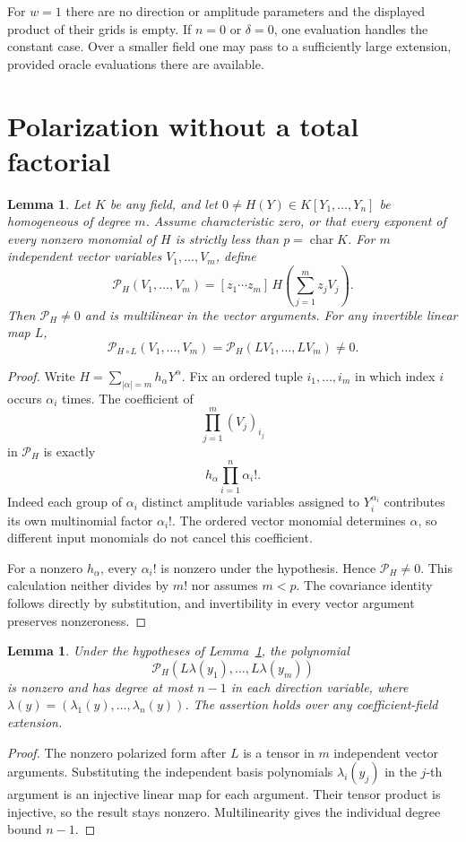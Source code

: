 \documentclass[11pt]{article}
\newtheorem{lemma}[theorem]{Lemma}
\begin{document}
For \(w=1\) there are no direction or amplitude parameters and
the displayed product of their grids is empty.
If \(n=0\) or \(\delta=0\), one evaluation handles the constant case.
Over a smaller field one may pass to a sufficiently large extension,
provided oracle evaluations there are available.

\section{Polarization without a total factorial}

\begin{lemma}\label{lem:polar}
Let \(K\) be any field, and let \(0\ne H(Y)\in K[Y_1,\ldots,Y_n]\)
be homogeneous of degree \(m\).
Assume characteristic zero, or that every exponent of every
nonzero monomial of \(H\) is strictly less than
\(p=\operatorname{char}K\).
For \(m\) independent vector variables \(V_1,\ldots,V_m\), define
\[
 \mathcal P_H(V_1,\ldots,V_m)
 =[z_1\cdots z_m]\,
 H\!\left(\sum_{j=1}^m z_j V_j\right).
\]
Then \(\mathcal P_H\ne0\) and is multilinear in the vector arguments.
For any invertible linear map \(L\),
\[
 \mathcal P_{H\circ L}(V_1,\ldots,V_m)
 =\mathcal P_H(LV_1,\ldots,LV_m)\ne0.
\]
\end{lemma}
\begin{proof}
Write \(H=\sum_{|\alpha|=m}h_\alpha Y^\alpha\).
Fix an ordered tuple \(i_1,\ldots,i_m\) in which index \(i\)
occurs \(\alpha_i\) times. The coefficient of
\[
 \prod_{j=1}^m (V_j)_{i_j}
\]
in \(\mathcal P_H\) is exactly
\[
 h_\alpha\prod_{i=1}^n\alpha_i!.
\]
Indeed each group of \(\alpha_i\) distinct amplitude variables
assigned to \(Y_i^{\alpha_i}\) contributes its own
multinomial factor \(\alpha_i!\).
The ordered vector monomial determines \(\alpha\), so different
input monomials do not cancel this coefficient.

For a nonzero \(h_\alpha\), every \(\alpha_i!\) is nonzero under
the hypothesis. Hence \(\mathcal P_H\ne0\).
This calculation neither divides by \(m!\) nor assumes \(m<p\).
The covariance identity follows directly by substitution, and
invertibility in every vector argument preserves nonzeroness.
\end{proof}

\begin{lemma}\label{lem:directions}
Under the hypotheses of Lemma~\ref{lem:polar}, the polynomial
\[
 \mathcal P_H(L\lambda(y_1),\ldots,L\lambda(y_m))
\]
is nonzero and has degree at most \(n-1\) in each direction
variable, where \(\lambda(y)=(\lambda_1(y),\ldots,\lambda_n(y))\).
The assertion holds over any coefficient-field extension.
\end{lemma}
\begin{proof}
The nonzero polarized form after \(L\) is a tensor in \(m\)
independent vector arguments. Substituting the independent basis
polynomials \(\lambda_i(y_j)\) in the \(j\)-th argument is an
injective linear map for each argument. Their tensor product
is injective, so the result stays nonzero.
Multilinearity gives the individual degree bound \(n-1\).
\end{proof}
\end{document}
